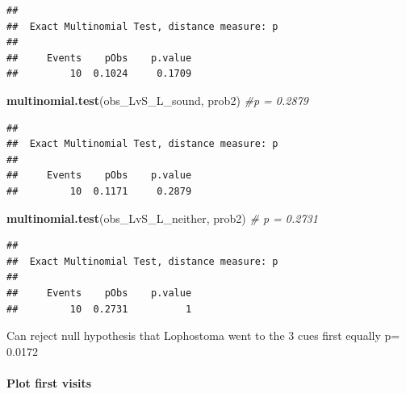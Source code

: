 \documentclass[]{article}
\newenvironment{Shaded}{\begin{snugshade}}{\end{snugshade}}
\newcommand{\KeywordTok}[1]{\textcolor[rgb]{0.13,0.29,0.53}{\textbf{{#1}}}}
\newcommand{\CommentTok}[1]{\textcolor[rgb]{0.56,0.35,0.01}{\textit{{#1}}}}
\newcommand{\NormalTok}[1]{{#1}}
\let\oldparagraph\paragraph
\renewcommand{\paragraph}[1]{\oldparagraph{#1}\mbox{}}
\begin{document}
\begin{verbatim}
## 
##  Exact Multinomial Test, distance measure: p
## 
##     Events    pObs    p.value
##         10  0.1024     0.1709
\end{verbatim}

\begin{Shaded}
\begin{Highlighting}[]
 \KeywordTok{multinomial.test}\NormalTok{(obs_LvS_L_sound, prob2) }\CommentTok{#p = 0.2879}
\end{Highlighting}
\end{Shaded}

\begin{verbatim}
## 
##  Exact Multinomial Test, distance measure: p
## 
##     Events    pObs    p.value
##         10  0.1171     0.2879
\end{verbatim}

\begin{Shaded}
\begin{Highlighting}[]
 \KeywordTok{multinomial.test}\NormalTok{(obs_LvS_L_neither, prob2) }\CommentTok{# p = 0.2731}
\end{Highlighting}
\end{Shaded}

\begin{verbatim}
## 
##  Exact Multinomial Test, distance measure: p
## 
##     Events    pObs    p.value
##         10  0.2731          1
\end{verbatim}

Can reject null hypothesis that Lophostoma went to the 3 cues first
equally p= 0.0172

\paragraph{Plot first visits}\label{plot-first-visits}
\end{document}
